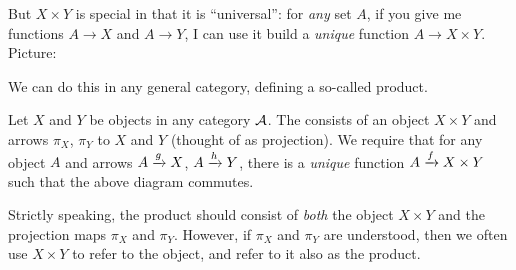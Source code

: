 But $X \times Y$ is special in that it is ``universal'':
for \emph{any} set $A$, if you give me functions $A \to X$ and $A \to Y$, I can use it
build a \emph{unique} function $A \to X \times Y$.
Picture:
\begin{center}
\end{center}

We can do this in any general category, defining a so-called product.
\begin{definition}
	Let $X$ and $Y$ be objects in any category $\AA$.
	The  consists of an object $X \times Y$
	and arrows $\pi_X$, $\pi_Y$ to $X$ and $Y$ (thought of as projection).
	We require that for any object $A$ and arrows $A \taking g X$, $A \taking h Y$, there
	is a \emph{unique} function $A \taking f X \times Y$ such that the above diagram commutes.
\end{definition}
\begin{abuse}
	Strictly speaking, the product should consist of \emph{both}
	the object $X \times Y$
	and the projection maps $\pi_X$ and $\pi_Y$.
	However, if $\pi_X$ and $\pi_Y$ are understood,
	then we often use $X \times Y$ to refer to the object,
	and refer to it also as the product.
	\label{abuse:object}
\end{abuse}


